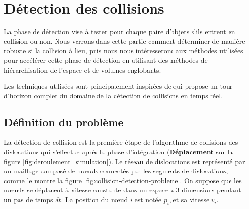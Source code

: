 \documentclass[11pt,class=article,float=false,crop=false]{standalone}
\begin{document}
\section{Détection des collisions}
La phase de détection vise à tester pour chaque paire d'objets s'ils entrent en collision ou non. Nous verrons dans cette partie comment déterminer de manière robuste si la collision à lieu, puis nous nous intéresserons aux méthodes utilisées pour accélérer cette phase de détection en utilisant des méthodes de hiérarchisation de l'espace et de volumes englobants. 

Les techniques utilisées sont principalement inspirées de  qui propose un tour d'horizon complet du domaine de la détection de collisions en temps réel.

\subsection{Définition du problème}
La détection de collision est la première étape de l'algorithme de collisions des dislocations qui s'effectue après la phase d'intégration (\textbf{Déplacement} sur la figure \ref{fig:deroulement_simulation}). Le réseau de dislocations est représenté par un maillage composé de noeuds connectés par les segments de dislocations, comme le montre la figure \ref{fig:collision-detection-probleme}. On suppose que les noeuds se déplacent à vitesse constante dans un espace à 3 dimensions pendant un pas de temps $dt$. La position du nœud $i$ est notée $p_i$, et sa vitesse $v_i$.
\end{document}
